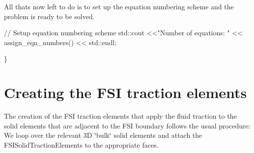 All that\textquotesingle{}s now left to do is to set up the equation numbering scheme and the problem is ready to be solved.


\begin{DoxyCodeInclude}
 
 \textcolor{comment}{// Setup equation numbering scheme}
 std::cout <<\textcolor{stringliteral}{"Number of equations: "} << assign\_eqn\_numbers() << std::endl; 
 
\}

\end{DoxyCodeInclude}




 

\hypertarget{index_fsi_traction}{}\section{Creating the F\+S\+I traction elements}\label{index_fsi_traction}
The creation of the F\+SI traction elements that apply the fluid traction to the solid elements that are adjacent to the F\+SI boundary follows the usual procedure\+: We loop over the relevant 3D \char`\"{}bulk\char`\"{} solid elements and attach the {\ttfamily F\+S\+I\+Solid\+Traction\+Elements} to the appropriate faces.


